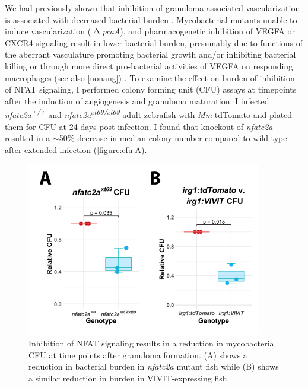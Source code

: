 We had previously shown that inhibition of granuloma\hyp{}associated vascularization is associated with decreased bacterial burden \citep{Oehlers2015}. Mycobacterial mutants unable to induce vascularization ($\upDelta$\textit{pcaA}), and pharmacogenetic inhibition of VEGFA or CXCR4 signaling result in lower bacterial burden, presumably due to functions of the aberrant vasculature promoting bacterial growth and/or inhibiting bacterial killing \citep{Glickman2000, Rao2005, Oehlers2015, Walton2018} or through more direct pro\hyp{}bacterial activities of VEGFA on responding macrophages (see also \autoref{nonang}) \citep{Harding2019}. To examine the effect on burden of inhibition of NFAT signaling, I performed colony forming unit (CFU) assays at timepoints after the induction of angiogenesis and granuloma maturation. I infected \textit{nfatc2a\textsuperscript{+/+}} and \textit{nfatc2a\textsuperscript{xt69/xt69}} adult zebrafish with \textit{Mm}\hyp{}tdTomato and plated them for CFU at 24 days post infection. I found that knockout of \textit{nfatc2a} resulted in a ${\sim}$50\% decrease in median colony number compared to wild\hyp{}type after extended infection (\autoref{figure:cfu}A). 

\begin{figure}
\centering
\includegraphics[height=3in]{images/cfu.pdf}
\caption[NFAT inhibition decreases bacterial burden]{Inhibition of NFAT signaling results in a reduction in mycobacterial CFU at time points after granuloma formation. (A) shows a reduction in bacterial burden in \textit{nfatc2a} mutant fish while (B) shows a similar reduction in burden in VIVIT\hyp{}expressing fish.}
\label{figure:cfu}

\end{figure}

